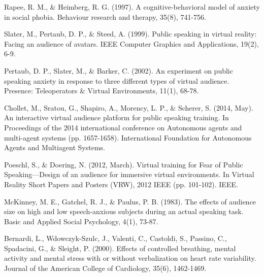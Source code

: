\documentclass[letterpaper,12pt]{article}
\begin{document}
\begin{thebibliography}{99}

Rapee, R. M., \& Heimberg, R. G. (1997). A cognitive-behavioral model of anxiety in social phobia. Behaviour research and therapy, 35(8), 741-756.

Slater, M., Pertaub, D. P., \& Steed, A. (1999). Public speaking in virtual reality: Facing an audience of avatars. IEEE Computer Graphics and Applications, 19(2), 6-9.

Pertaub, D. P., Slater, M., \& Barker, C. (2002). An experiment on public speaking anxiety in response to three different types of virtual audience. Presence: Teleoperators \& Virtual Environments, 11(1), 68-78.

Chollet, M., Sratou, G., Shapiro, A., Morency, L. P., \& Scherer, S. (2014, May). An interactive virtual audience platform for public speaking training. In Proceedings of the 2014 international conference on Autonomous agents and multi-agent systems (pp. 1657-1658). International Foundation for Autonomous Agents and Multiagent Systems.

Poeschl, S., \& Doering, N. (2012, March). Virtual training for Fear of Public Speaking—Design of an audience for immersive virtual environments. In Virtual Reality Short Papers and Posters (VRW), 2012 IEEE (pp. 101-102). IEEE.

McKinney, M. E., Gatchel, R. J., \& Paulus, P. B. (1983). The effects of audience size on high and low speech-anxious subjects during an actual speaking task. Basic and Applied Social Psychology, 4(1), 73-87.

Bernardi, L., Wdowczyk-Szulc, J., Valenti, C., Castoldi, S., Passino, C., Spadacini, G., \& Sleight, P. (2000). Effects of controlled breathing, mental activity and mental stress with or without verbalization on heart rate variability. Journal of the American College of Cardiology, 35(6), 1462-1469.
\end{thebibliography}
\end{document}
